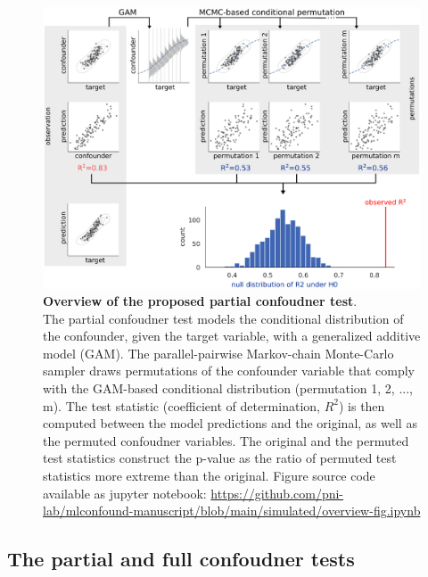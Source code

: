 \documentclass{article}
\begin{document}
\begin{figure}[!b]
  \centering
  \includegraphics[width=0.75\paperwidth]{fig/overview.eps}
  \caption{\textbf{Overview of the proposed partial confoudner test}. \\
    The partial confoudner test models the conditional distribution of the confounder, given the target variable, with a generalized additive model (GAM). The parallel-pairwise Markov-chain Monte-Carlo sampler draws permutations of the confounder variable that comply with the GAM-based conditional distribution (permutation 1, 2, ..., m). The test statistic (coefficient of determination, $R^2$) is then computed between the model predictions and the original, as well as the permuted confoudner variables. The original and the permuted test statistics construct the p-value as the ratio of permuted test statistics more extreme than the original. Figure source code available as jupyter notebook: \href{https://github.com/pni-lab/mlconfound-manuscript/blob/main/simulated/overview-fig.ipynb}{https://github.com/pni-lab/mlconfound-manuscript/blob/main/simulated/overview-fig.ipynb}
  }
  \label{fig:overview}
\end{figure}


\subsection{The partial and full confoudner tests}
\end{document}
